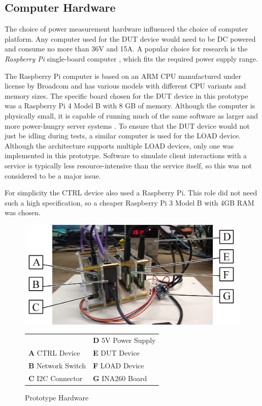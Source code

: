 \subsection{Computer Hardware}

The choice of power measurement hardware influenced the choice of computer platform. Any computer used for the DUT device would need to be DC powered  and consume no more than 36V and 15A. A popular choice for research is the \emph{Raspberry Pi} single-board computer \citep{RaspberryPi}, which fits the required power supply range.

The Raspberry Pi computer is based on an ARM CPU \citep{ARM} manufactured under license by Broadcom and has various models with different CPU variants and memory sizes. The specific board chosen for the DUT device in this prototype was a Raspberry Pi 4 Model B with 8 GB of memory. Although the computer is physically small, it is capable of running much of the same software as larger and more power-hungry server systems \citep{Varghese2015}. To ensure that the DUT device would not just be idling during tests, a similar computer is used for the LOAD device. Although the architecture supports multiple LOAD devices, only one was implemented in this prototype. Software to simulate client interactions with a service is typically less resource-intensive than the service itself, so this was not considered to be a major issue.

For simplicity the CTRL device also used a Raspberry Pi. This role did not need such a high specification, so a cheaper Raspberry Pi 3 Model B with 4GB RAM was chosen. 

\begin{figure}[htbp]
  \centering
  \includegraphics[width=\columnwidth]{Figures/rig/testrig-annotated-1.png}
  \label{hardware}
  \begin{tabular}{|ll|}
  \hline
                                   & \textbf{D} \quad 5V Power Supply \\
  \textbf{A} \quad CTRL Device     & \textbf{E} \quad DUT Device \\
  \textbf{B} \quad Network Switch  & \textbf{F} \quad LOAD Device \\
  \textbf{C} \quad I2C Connector   & \textbf{G} \quad INA260 Board \\
  \hline
  \end{tabular}
  \caption{Prototype Hardware}
\end{figure}

